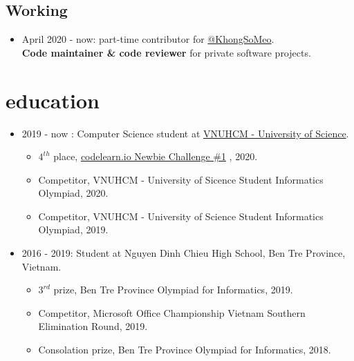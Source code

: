 \documentclass{article}
\begin{document}
\subsection{Working}
\begin{itemize}
\item April 2020 - now: part-time contributor for \href{https://github.com/khongsomeo}{@KhongSoMeo}.\\
\textbf{Code maintainer \& code reviewer} for private software projects.
\end{itemize}

\section{education}
\begin{itemize}
\item 2019 - now : Computer Science student at \href{https://en.hcmus.edu.vn}{VNUHCM - University of Science}.
\begin{itemize}
\item $4^{th}$ place, \href{https://codelearn.io/fights/detail/674466}{codelearn.io Newbie Challenge \#1} , 2020.
\item Competitor, VNUHCM - University of Sicence Student Informatics Olympiad, 2020.
\item Competitor, VNUHCM - University of Science Student Informatics Olympiad, 2019.

\end{itemize}
\item 2016 - 2019: Student at Nguyen Dinh Chieu High School, Ben Tre Province, Vietnam.
\begin{itemize}
\item $3^{rd}$ prize, Ben Tre Province Olympiad for Informatics, 2019.
\item Competitor, Microsoft Office Championship Vietnam Southern Elimination Round, 2019.
\item Consolation prize, Ben Tre Province Olympiad for Informatics, 2018.
\end{itemize}
\end{itemize}
\end{document}
